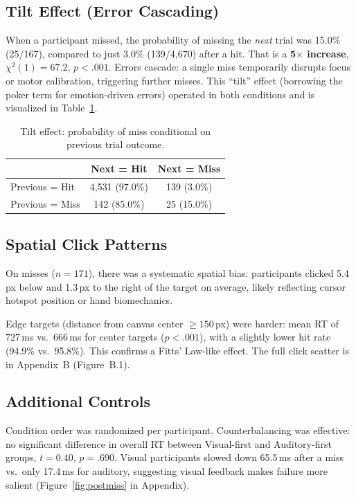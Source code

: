 \documentclass[12pt,letterpaper]{article}
\begin{document}
\subsection{Tilt Effect (Error Cascading)}

When a participant missed, the probability of missing the \emph{next} trial was 15.0\% (25/167), compared to just 3.0\% (139/4{,}670) after a hit. That is a \textbf{5$\times$ increase}, $\chi^2(1) = 67.2$, $p < .001$. Errors cascade: a single miss temporarily disrupts focus or motor calibration, triggering further misses. This ``tilt'' effect (borrowing the poker term for emotion-driven errors) operated in both conditions and is visualized in Table~\ref{tab:tilt}.

\begin{table}[H]
\centering
\caption{Tilt effect: probability of miss conditional on previous trial outcome.}
\label{tab:tilt}
\begin{tabular}{lcc}
\toprule
& \textbf{Next = Hit} & \textbf{Next = Miss} \\
\midrule
Previous = Hit & 4{,}531 (97.0\%) & 139 (3.0\%) \\
Previous = Miss & 142 (85.0\%) & 25 (15.0\%) \\
\bottomrule
\end{tabular}
\end{table}

\subsection{Spatial Click Patterns}

On misses ($n = 171$), there was a systematic spatial bias: participants clicked 5.4\,px below and 1.3\,px to the right of the target on average, likely reflecting cursor hotspot position or hand biomechanics.

Edge targets (distance from canvas center $\geq 150$\,px) were harder: mean RT of 727\,ms vs.\ 666\,ms for center targets ($p < .001$), with a slightly lower hit rate (94.9\% vs.\ 95.8\%). This confirms a Fitts' Law-like effect. The full click scatter is in Appendix~B (Figure~B.1).

\subsection{Additional Controls}

Condition order was randomized per participant. Counterbalancing was effective: no significant difference in overall RT between Visual-first and Auditory-first groups, $t = 0.40$, $p = .690$. Visual participants slowed down 65.5\,ms after a miss vs.\ only 17.4\,ms for auditory, suggesting visual feedback makes failure more salient (Figure~\ref{fig:postmiss} in Appendix).
\end{document}
